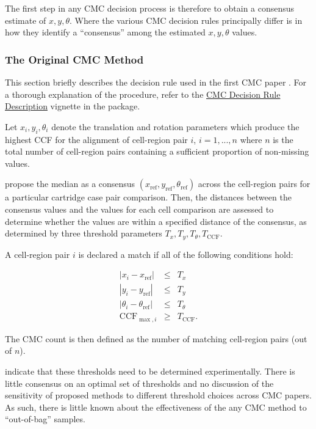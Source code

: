 The first step in any CMC decision process is therefore to obtain a
consensus estimate of \(x, y, \theta\). Where the various CMC decision
rules principally differ is in how they identify a ``consensus'' among
the estimated \(x,y, \theta\) values.

\hypertarget{originalMethod}{%
\subsubsection{The Original CMC Method}\label{originalMethod}}

This section briefly describes the decision rule used in the first CMC
paper \citep{song_proposed_2013}. For a thorough explanation of the
procedure, refer to the
\href{https://csafe-isu.github.io/cmcR/articles/decisionRuleDescription.html}{CMC
Decision Rule Description} vignette in the  package.

Let \(x_i, y_i, \theta_i\) denote the translation and rotation
parameters which produce the highest CCF for the alignment of
cell-region pair \(i\), \(i = 1,...,n\) where \(n\) is the total number
of cell-region pairs containing a sufficient proportion of non-missing
values.

\citet{song_proposed_2013} propose the median as a consensus
\((x_{\text{ref}}, y_{\text{ref}}, \theta_{\text{ref}})\) across the
cell-region pairs for a particular cartridge case pair comparison. Then,
the distances between the consensus values and the values for each cell
comparison are assessed to determine whether the values are within a
specified distance of the consensus, as determined by three threshold
parameters \(T_{x}, T_{y}, T_\theta, T_{\text{CCF}}\).

A cell-region pair \(i\) is declared a match if all of the following
conditions hold:

\begin{eqnarray}\label{eq:original}
|x_i - x_{\text{ref}}| &\leq& T_{x} \\ \nonumber
|y_i - y_{\text{ref}}| &\leq& T_{y} \\ \nonumber
|\theta_i - \theta_{\text{ref}}| &\leq& T_{\theta} \\ \nonumber
\text{CCF}_{\max,i} &\geq& T_{\text{CCF}}.
\end{eqnarray}

The CMC count is then defined as the number of matching cell-region
pairs (out of \(n\)).

\citet{song_3d_2014} indicate that these thresholds need to be
determined experimentally. There is little consensus on an optimal set
of thresholds and no discussion of the sensitivity of proposed methods
to different threshold choices across CMC papers. As such, there is
little known about the effectiveness of the any CMC method to
``out-of-bag'' samples.

